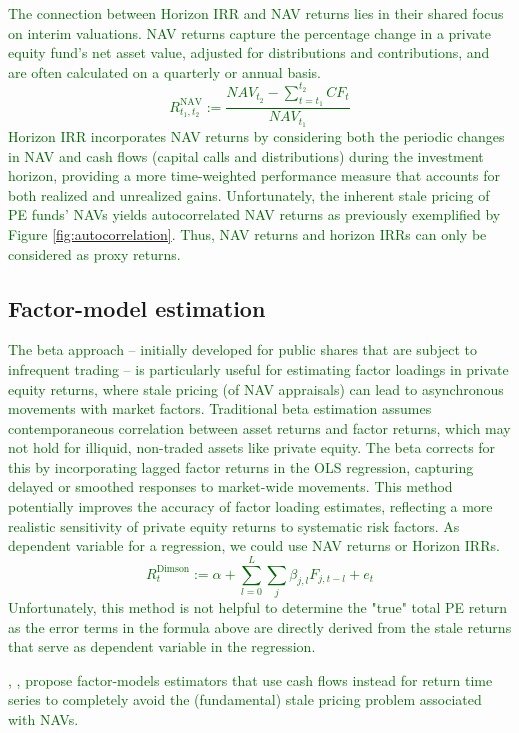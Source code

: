 \textcolor{darkgreen}{
	The connection between Horizon IRR and NAV returns lies in their shared focus on interim valuations. 
	NAV returns capture the percentage change in a private equity fund's net asset value, adjusted for distributions and contributions, and are often calculated on a quarterly or annual basis. 
	\[
	R_{t_1, t_2}^{\mathrm{NAV}} := \frac{{NAV}_{t_2} - \sum_{t=t_1}^{t_2} {CF}_t }{{NAV}_{t_1}}
	\]
	Horizon IRR incorporates NAV returns by considering both the periodic changes in NAV and cash flows (capital calls and distributions) during the investment horizon, providing a more time-weighted performance measure that accounts for both realized and unrealized gains. 
	Unfortunately, the inherent stale pricing of PE funds' NAVs yields autocorrelated NAV returns as previously exemplified by Figure \ref{fig:autocorrelation}.
	Thus, NAV returns and horizon IRRs can only be considered as proxy returns.
	}
	
\subsection{Factor-model estimation}

\textcolor{darkgreen}{
	The \cite{dimson1979risk} beta approach -- initially developed for public shares that are subject to infrequent trading -- is particularly useful for estimating factor loadings in private equity returns, where stale pricing (of NAV appraisals) can lead to asynchronous movements with market factors. 
	Traditional beta estimation assumes contemporaneous correlation between asset returns and factor returns, which may not hold for illiquid, non-traded assets like private equity. 
	The \cite{dimson1979risk} beta corrects for this by incorporating lagged factor returns in the OLS regression, capturing delayed or smoothed responses to market-wide movements. 
	This method potentially improves the accuracy of factor loading estimates, reflecting a more realistic sensitivity of private equity returns to systematic risk factors.
	As dependent variable for a \cite{dimson1979risk} regression, we could use NAV returns or Horizon IRRs.
	\[
	R_t^{\mathrm{Dimson}} := 
	\alpha + \sum_{l=0}^L \sum_j \beta_{j,l} F_{j,t-l} + e_{t}
	\]
	Unfortunately, this method is not helpful to determine the "true" total PE return as the error terms in the formula above are directly derived from the stale returns that serve as dependent variable in the regression. 
}

\textcolor{darkgreen}{
	\cite{DLP12}, \cite{KN16}, \cite{ACGP18} propose factor-models estimators that use cash flows instead for return time series to completely avoid the (fundamental) stale pricing problem associated with NAVs.
}

